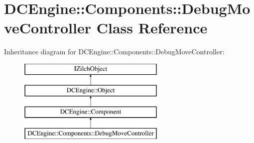 \hypertarget{classDCEngine_1_1Components_1_1DebugMoveController}{\section{D\-C\-Engine\-:\-:Components\-:\-:Debug\-Move\-Controller Class Reference}
\label{classDCEngine_1_1Components_1_1DebugMoveController}
}
Inheritance diagram for D\-C\-Engine\-:\-:Components\-:\-:Debug\-Move\-Controller\-:\begin{figure}[H]
\begin{center}
\leavevmode
\includegraphics[height=4.000000cm]{classDCEngine_1_1Components_1_1DebugMoveController}
\end{center}
\end{figure}
